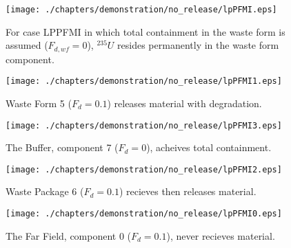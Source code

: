 \begin{figure}[ht]
\centering
\texttt{[image: ./chapters/demonstration/no\_release/lpPFMI.eps]}
\caption[$^{235}U$ residence. Lumped Parameter PFM Waste Form No Release.]{
For case LPPFMI  in which total containment in the waste form is assumed 
($F_{d,wf}=0$), $^{235}U$ resides permanently in the waste form component.
}
\label{fig:lpPFMIall}
\begin{minipage}[b]{0.45\linewidth}

  \texttt{[image: ./chapters/demonstration/no\_release/lpPFMI1.eps]}
  \caption[LPPFMI Waste Form Contaminants.]{
    Waste Form 5 ($F_d = 0.1$) releases material with degradation. 
    }
  \label{fig:lpPFMIwf5}
  
  \texttt{[image: ./chapters/demonstration/no\_release/lpPFMI3.eps]}
  \caption[Case LPPFMI Buffer Contaminants]{
    The Buffer, component 7 ($F_d=0$), acheives total containment.
    }
  \label{fig:lpPFMIbuff}

\end{minipage}
\hspace{0.05\linewidth}
\begin{minipage}[b]{0.45\linewidth}
  \texttt{[image: ./chapters/demonstration/no\_release/lpPFMI2.eps]}
  \caption[Case LPPFMI Waste Package Contaminants.]{ 
    Waste Package 6 ($F_d = 0.1$) recieves then releases material. 
    }
  \label{fig:lpPFMIwp6}

  \texttt{[image: ./chapters/demonstration/no\_release/lpPFMI0.eps]}
  \caption[Case LPPFMI Waste Package Contaminants.]{ 
    The Far Field, component 0 ($F_d = 0.1$), never recieves material.
    }
  \label{fig:lpPFMIff0}


  \end{minipage}
\end{figure}
